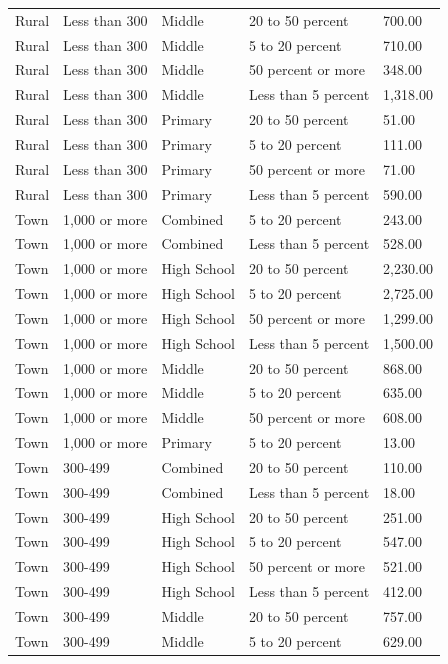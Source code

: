 \documentclass[
  man, fleqn, noextraspace]{apa6}
\begin{document}
\begin{table}[tbp]
\begin{center}
\begin{threeparttable}
\begin{tabular}{lllll}
Rural & Less than 300 & Middle & 20 to 50 percent & 700.00\\
Rural & Less than 300 & Middle & 5 to 20 percent & 710.00\\
Rural & Less than 300 & Middle & 50 percent or more & 348.00\\
Rural & Less than 300 & Middle & Less than 5 percent & 1,318.00\\
Rural & Less than 300 & Primary & 20 to 50 percent & 51.00\\
Rural & Less than 300 & Primary & 5 to 20 percent & 111.00\\
Rural & Less than 300 & Primary & 50 percent or more & 71.00\\
Rural & Less than 300 & Primary & Less than 5 percent & 590.00\\
Town & 1,000 or more & Combined & 5 to 20 percent & 243.00\\
Town & 1,000 or more & Combined & Less than 5 percent & 528.00\\
Town & 1,000 or more & High School & 20 to 50 percent & 2,230.00\\
Town & 1,000 or more & High School & 5 to 20 percent & 2,725.00\\
Town & 1,000 or more & High School & 50 percent or more & 1,299.00\\
Town & 1,000 or more & High School & Less than 5 percent & 1,500.00\\
Town & 1,000 or more & Middle & 20 to 50 percent & 868.00\\
Town & 1,000 or more & Middle & 5 to 20 percent & 635.00\\
Town & 1,000 or more & Middle & 50 percent or more & 608.00\\
Town & 1,000 or more & Primary & 5 to 20 percent & 13.00\\
Town & 300-499 & Combined & 20 to 50 percent & 110.00\\
Town & 300-499 & Combined & Less than 5 percent & 18.00\\
Town & 300-499 & High School & 20 to 50 percent & 251.00\\
Town & 300-499 & High School & 5 to 20 percent & 547.00\\
Town & 300-499 & High School & 50 percent or more & 521.00\\
Town & 300-499 & High School & Less than 5 percent & 412.00\\
Town & 300-499 & Middle & 20 to 50 percent & 757.00\\
Town & 300-499 & Middle & 5 to 20 percent & 629.00\\

\end{tabular}
\end{threeparttable}
\end{center}
\end{table}
\end{document}
